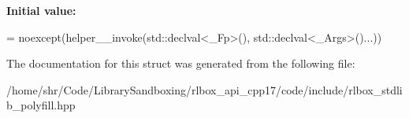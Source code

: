 {\bfseries Initial value\+:}
\begin{DoxyCode}
=
    noexcept(helper\_\_invoke(std::declval<\_Fp>(), std::declval<\_Args>()...))
\end{DoxyCode}


The documentation for this struct was generated from the following file\+:\begin{DoxyCompactItemize}
\item 
/home/shr/\+Code/\+Library\+Sandboxing/rlbox\+\_\+api\+\_\+cpp17/code/include/rlbox\+\_\+stdlib\+\_\+polyfill.\+hpp\end{DoxyCompactItemize}
